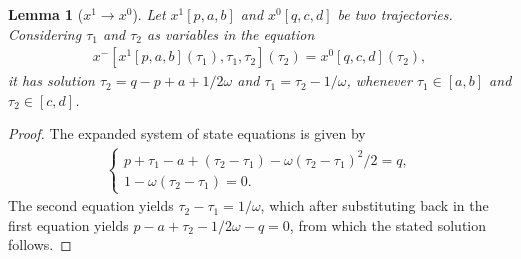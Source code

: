 \documentclass[a4paper]{article}
\theoremstyle{definition}
\theoremstyle{plain}
\newtheorem{lemma}{Lemma}
\begin{document}
\begin{lemma}[$x^{1} \rightarrow x^{0}$]
  Let $x^{1}[p, a, b]$ and $x^{0}[q, c, d]$ be two trajectories. Considering
  $\tau_{1}$ and $\tau_{2}$ as variables in the equation
  \begin{align*}
    x^{-}[x^{1}[p, a, b](\tau_{1}), \tau_{1}, \tau_{2}](\tau_{2}) = x^{0}[q, c, d](\tau_{2}) ,
  \end{align*}
  it has solution
  $\tau_{2} = q - p + a + 1/2\omega$ and $\tau_{1} = \tau_{2} - 1/\omega$, whenever
  $\tau_{1} \in [a, b]$ and $\tau_{2} \in [c, d]$.
\end{lemma}
\begin{proof}
  The expanded system of state equations is given by
  \begin{align*}
    \begin{cases}
      p + \tau_{1} - a + (\tau_{2} - \tau_{1}) - \omega(\tau_{2} - \tau_{1})^{2} / 2 = q , \\
      1 - \omega(\tau_{2} - \tau_{1}) = 0 .
    \end{cases}
  \end{align*}
  The second equation yields $\tau_{2} - \tau_{1} = 1/\omega$, which after
  substituting back in the first equation yields
  $p - a + \tau_{2} - 1/2\omega - q = 0$, from which the stated solution
  follows.
\end{proof}
\end{document}
